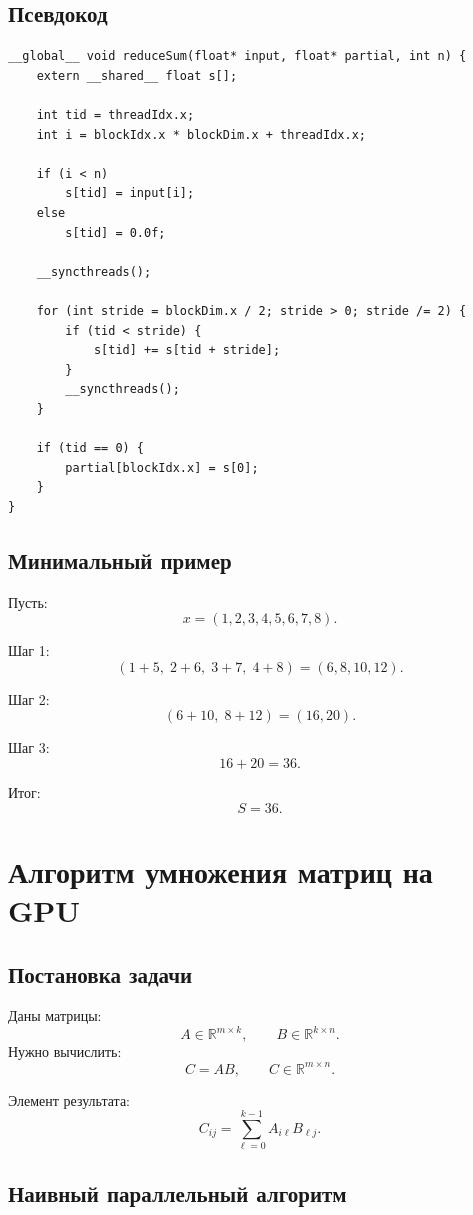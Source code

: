 \documentclass[12pt,a4paper]{article}
\begin{document}
\subsection{Псевдокод}

\begin{lstlisting}[style=cuda]
__global__ void reduceSum(float* input, float* partial, int n) {
    extern __shared__ float s[];

    int tid = threadIdx.x;
    int i = blockIdx.x * blockDim.x + threadIdx.x;

    if (i < n)
        s[tid] = input[i];
    else
        s[tid] = 0.0f;

    __syncthreads();

    for (int stride = blockDim.x / 2; stride > 0; stride /= 2) {
        if (tid < stride) {
            s[tid] += s[tid + stride];
        }
        __syncthreads();
    }

    if (tid == 0) {
        partial[blockIdx.x] = s[0];
    }
}
\end{lstlisting}

\subsection{Минимальный пример}

Пусть:
\[
    x = (1,2,3,4,5,6,7,8).
\]

Шаг 1:
\[
    (1+5,\;2+6,\;3+7,\;4+8) = (6,8,10,12).
\]

Шаг 2:
\[
    (6+10,\;8+12) = (16,20).
\]

Шаг 3:
\[
    16+20 = 36.
\]

Итог:
\[
    S = 36.
\]

\section{Алгоритм умножения матриц на GPU}

\subsection{Постановка задачи}

Даны матрицы:
\[
    A \in \mathbb{R}^{m \times k}, \qquad
    B \in \mathbb{R}^{k \times n}.
\]
Нужно вычислить:
\[
    C = AB,\qquad C \in \mathbb{R}^{m \times n}.
\]

Элемент результата:
\[
    C_{ij} = \sum_{\ell=0}^{k-1} A_{i\ell}B_{\ell j}.
\]

\subsection{Наивный параллельный алгоритм}
\end{document}
